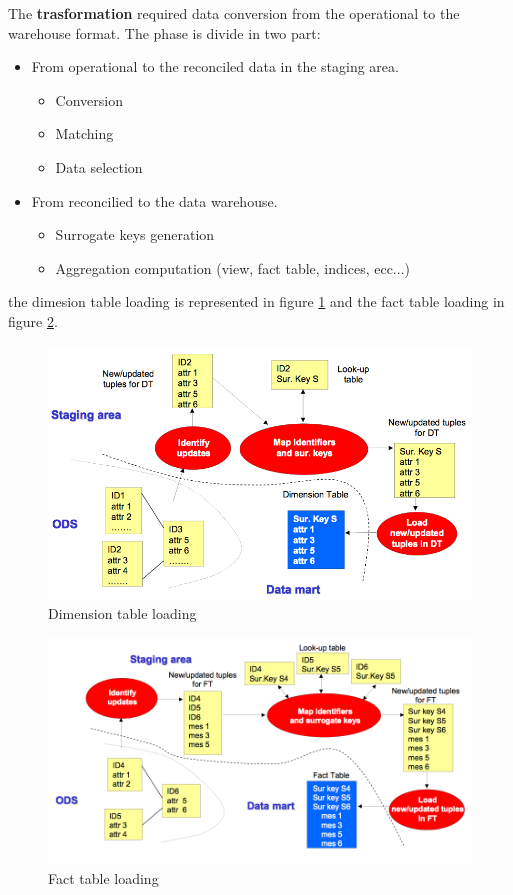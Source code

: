 \documentclass[12pt]{article}
\begin{document}
The \textbf{trasformation} required data conversion from the operational to the warehouse format. The phase is divide in two part:
\begin{itemize}
  \item From operational to the reconciled data in the staging area.
  \begin{itemize}
    \item Conversion
    \item Matching
    \item Data selection
  \end{itemize}
  \item From reconcilied to the data warehouse.
  \begin{itemize}
    \item Surrogate keys generation
    \item Aggregation computation (view, fact table, indices, ecc...)
  \end{itemize}
\end{itemize}
the dimesion table loading is represented in figure \ref{fig:dimload} and the fact table loading in figure \ref{fig:factload}.

\begin{figure}[h!]
  \includegraphics[width=\linewidth]{images/dimload.png}
  \caption{Dimension table loading}
  \label{fig:dimload}
\end{figure}
\begin{figure}[h!]
  \includegraphics[width=\linewidth]{images/factload.png}
  \caption{Fact table loading}
  \label{fig:factload}
\end{figure}
\end{document}
